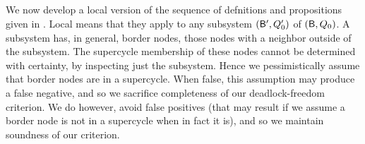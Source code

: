 %
\subsection{}
\label{s:local.fixpoint}

We now develop a local version of the sequence of defnitions and propositions given in .  Local means that they apply to any
subsystem $(\mathsf{B}', Q'_0)$ of $(\mathsf{B}, Q_0)$. A subsystem has, in general, border nodes, \ie those nodes with a neighbor outside of the
subsystem. The supercycle membership of these nodes cannot be determined with certainty, by inspecting just the subsystem.
Hence we pessimistically assume that border nodes are in a supercycle. When false, this assumption may produce a false negative, and so we sacrifice
completeness of our deadlock-freedom criterion. We do however, avoid false positives (that may result if we assume a border node is not in a supercycle when in fact it
is), and so we maintain soundness of our criterion. 


